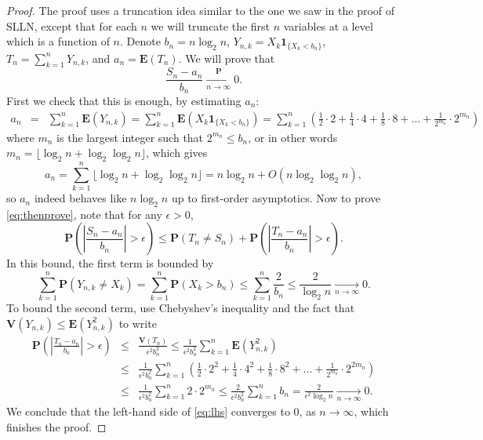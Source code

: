 \documentclass[12pt]{article}
\newcommand{\prob}{\mathbf{P}}
\newcommand{\expec}{\mathbf{E}}
\newcommand{\var}{\mathbf{V}}
\newcommand{\ind}{\textbf{1}}
\theoremstyle{example}
\begin{document}
\begin{proof} 
The proof uses a truncation idea similar to the one we saw in the proof of SLLN, except that for each $n$ we will truncate the first $n$ variables at a level which is a function of $n$. Denote $b_n = n\log_2 n$, $Y_{n,k} = X_k \ind_{\{X_k<b_n\}}$, $T_n=\sum_{k=1}^n Y_{n,k}$, and $a_n = \expec(T_n)$. We will prove that
\begin{equation}\label{eq:thenprove}
\frac{S_n-a_n}{b_n}\xrightarrow[n\to\infty]{\prob} 0.
\end{equation}
First we check that this is enough, by estimating $a_n$:
\begin{eqnarray*}
a_n &=& \sum_{k=1}^n \expec(Y_{n,k}) = \sum_{k=1}^n \expec(X_k \ind_{\{X_k<b_n\}})
= \sum_{k=1}^n \left(\frac12\cdot 2 + \frac14\cdot 4 + \frac18 \cdot 8 + \ldots + \frac{1}{2^{m_{n}}}\cdot 2^{m_{n}}
\right)
\end{eqnarray*}
where $m_n$ is the largest integer such that $2^{m_n} \le b_n$, or in other words
$ m_n = \lfloor \log_2 n + \log_2 \log_2 n \rfloor$, which gives
$$ a_n = \sum_{k=1}^n \lfloor \log_2 n + \log_2 \log_2 n \rfloor = n \log_2 n + O(n \log_2 \log_2 n), $$
so $a_n$ indeed behaves like $n\log_2 n$ up to first-order asymptotics.
Now to prove \eqref{eq:thenprove}, note that for any $\epsilon>0$,
\begin{equation} \label{eq:lhs}
\prob\left( \left|\frac{S_n-a_n}{b_n}\right| > \epsilon\right) \le
\prob(T_n\neq S_n) + \prob\left( \left|\frac{T_n-a_n}{b_n}\right| > \epsilon\right).
\end{equation}
In this bound, the first term is bounded by 
$$\sum_{k=1}^n \prob(Y_{n,k}\neq X_k) = \sum_{k=1}^n \prob(X_k>b_n) \le \sum_{k=1}^n \frac{2}{b_n}
\le \frac{2}{\log_2 n} \xrightarrow[n\to\infty]{} 0. $$
To bound the second term, use Chebyshev's inequality and the fact that $\var(Y_{n,k})\le \expec(Y_{n,k}^2)$ to write
\begin{eqnarray*}
\prob\left( \left|\frac{T_n-a_n}{b_n}\right| > \epsilon\right) &\le& \frac{\var(T_n)}{\epsilon^2 b_n^2}
\le \frac{1}{\epsilon^2 b_n^2} \sum_{k=1}^n \expec(Y_{n,k}^2) \\
&\le& \frac{1}{\epsilon^2 b_n^2} \sum_{k=1}^n 
\left(\frac12\cdot 2^2 + \frac14\cdot 4^2 + \frac18 \cdot 8^2 + \ldots + \frac{1}{2^{m_{n}}}\cdot 2^{2m_{n}} \right)
\\ &\le&
\frac{1}{\epsilon^2 b_n^2} \sum_{k=1}^n 2\cdot 2^{m_n}
\le \frac{2}{\epsilon^2 b_n^2} \sum_{k=1}^n b_n = \frac{2}{\epsilon^2 \log_2 n} \xrightarrow[n\to\infty]{} 0.
\end{eqnarray*}
We conclude that the left-hand side of \eqref{eq:lhs} converges to 0, as $n\to\infty$, which finishes the proof.
\end{proof}
\end{document}
